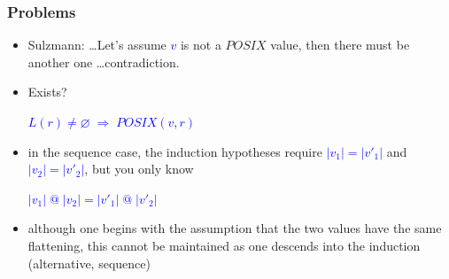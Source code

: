 \documentclass[dvipsnames,14pt,t]{beamer}
\newcommand{\bl}[1]{\textcolor{blue}{#1}}
\begin{document}
\begin{frame}[c]
\frametitle{Problems}

\begin{itemize}
\item Sulzmann: \ldots Let's assume \bl{$v$} is not 
    a $POSIX$ value, then there must be another one
    \ldots contradiction.\bigskip\pause

\item Exists?

\begin{center}
\bl{$L(r) \not= \varnothing \;\Rightarrow\; POSIX(v, r)$}
\end{center}\bigskip\bigskip\pause

\item in the sequence case, the induction hypotheses require
\bl{$|v_1| = |v'_1|$} and \bl{$|v_2| = |v'_2|$}, 
but you only know

\begin{center}
\bl{$|v_1| \;@\; |v_2| = |v'_1| \;@\; |v'_2|$}
\end{center}\pause\small

\item although one begins with the assumption that the two 
values have the same flattening, this cannot be maintained 
as one descends into the induction (alternative, sequence)
\end{itemize}

\end{frame}
\end{document}
